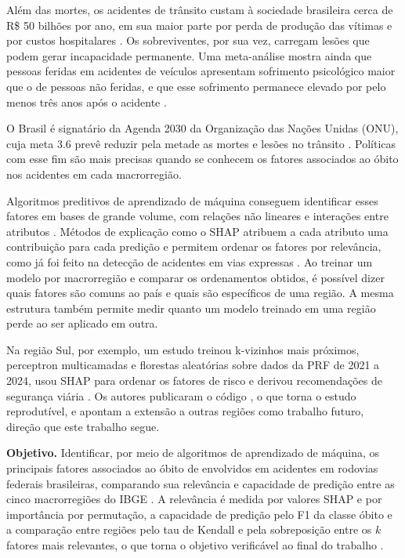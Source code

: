\documentclass[12pt]{article}
\begin{document}
Além das mortes, os acidentes de trânsito custam à sociedade brasileira
cerca de R\$ 50 bilhões por ano, em sua maior parte por perda de
produção das vítimas e por custos hospitalares \cite{carvalho2020}. Os
sobreviventes, por sua vez, carregam lesões que podem gerar incapacidade
permanente. Uma meta-análise mostra ainda que pessoas feridas em acidentes de
veículos apresentam sofrimento psicológico maior que o de pessoas não
feridas, e que esse sofrimento permanece elevado por pelo menos três
anos após o acidente \cite{craig2016}.

O Brasil é signatário da Agenda 2030 da Organização das Nações Unidas
(ONU), cuja meta 3.6 prevê reduzir pela metade as mortes e lesões no
trânsito \cite{onu2015}. Políticas com esse fim são mais precisas
quando se conhecem os fatores associados ao óbito nos acidentes em
cada macrorregião.

Algoritmos preditivos de aprendizado de máquina conseguem identificar
esses fatores em bases de grande volume, com relações não lineares e interações entre
atributos \cite{ali2024}. Métodos de explicação como o SHAP
\cite{lundberg2017} atribuem a cada atributo uma contribuição para cada
predição e permitem ordenar os fatores por relevância, como já foi feito
na detecção de acidentes em vias expressas \cite{parsa2020}. Ao treinar
um modelo por macrorregião e comparar os ordenamentos obtidos, é
possível dizer quais fatores são comuns ao país e quais são específicos
de uma região. A mesma estrutura também permite medir quanto um
modelo treinado em uma região perde ao ser aplicado em outra.

Na região Sul, por exemplo, um estudo treinou k-vizinhos mais próximos,
perceptron multicamadas e florestas aleatórias sobre dados da PRF de
2021 a 2024, usou SHAP para ordenar os fatores de risco e derivou
recomendações de segurança viária \cite{gabardo2025}. Os autores
publicaram o código \cite{gabardo2025codigo}, o que torna o estudo
reprodutível, e apontam a extensão a outras regiões como trabalho
futuro, direção que este trabalho segue.

\textbf{Objetivo.} Identificar, por meio de algoritmos de aprendizado de
máquina, os principais fatores associados ao óbito de envolvidos em acidentes em
rodovias federais brasileiras, comparando sua relevância e capacidade de
predição entre as cinco macrorregiões do IBGE \cite{ibge2017}. A
relevância é medida por valores SHAP e por importância por permutação,
a capacidade de predição pelo F1 da classe óbito e a comparação entre regiões pelo tau de Kendall e pela
sobreposição entre os $k$ fatores mais relevantes, o que torna o
objetivo verificável ao final do trabalho \cite{wazlawick2009}.
\end{document}
